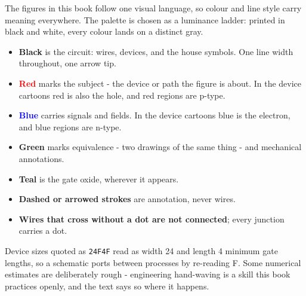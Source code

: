 The figures in this book follow one visual language, so colour and
line style carry meaning everywhere. The palette is chosen as a
luminance ladder: printed in black and white, every colour lands on
a distinct gray.

\begin{itemize}
\item \textbf{Black} is the circuit: wires, devices, and the house
  symbols. One line width throughout, one arrow tip.
\item \textcolor{red}{\textbf{Red}} marks the subject - the device or
  path the figure is about. In the device cartoons red is also the
  hole, and red regions are p-type.
\item \textcolor{blue}{\textbf{Blue}} carries signals and fields. In
  the device cartoons blue is the electron, and blue regions are
  n-type.
\item \textcolor{armygreen}{\textbf{Green}} marks equivalence - two
  drawings of the same thing - and mechanical annotations.
\item {\color{oxteal}\textbf{Teal}} is the gate oxide,
  wherever it appears.
\item \textbf{Dashed or arrowed strokes} are annotation, never wires.
\item \textbf{Wires that cross without a dot are not connected};
  every junction carries a dot.
\end{itemize}

Device sizes quoted as \texttt{24F4F} read as width 24 and length 4
minimum gate lengths, so a schematic ports between processes by
re-reading F. Some numerical estimates are deliberately rough -
engineering hand-waving is a skill this book practices openly, and
the text says so where it happens.
